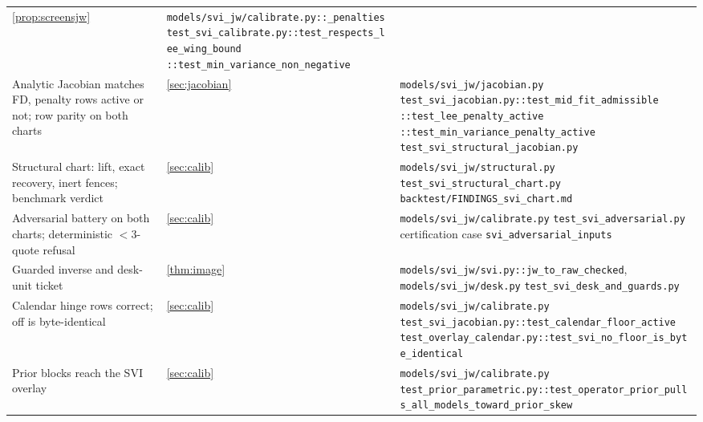 \documentclass[11pt]{article}
\begin{document}
\begin{longtable}{@{}p{}p{}p{}@{}}
\cref{prop:screensjw} &
\nolinkurl{models/svi_jw/calibrate.py::_penalties}\newline
\nolinkurl{test_svi_calibrate.py::test_respects_lee_wing_bound}\newline
\nolinkurl{::test_min_variance_non_negative}\\
\addlinespace
Analytic Jacobian matches FD, penalty rows active or not; row parity on
both charts &
\cref{sec:jacobian} &
\nolinkurl{models/svi_jw/jacobian.py}\newline
\nolinkurl{test_svi_jacobian.py::test_mid_fit_admissible}\newline
\nolinkurl{::test_lee_penalty_active}\newline
\nolinkurl{::test_min_variance_penalty_active}\newline
\nolinkurl{test_svi_structural_jacobian.py}\\
\addlinespace
Structural chart: lift, exact recovery, inert fences; benchmark verdict &
\cref{sec:calib} &
\nolinkurl{models/svi_jw/structural.py}\newline
\nolinkurl{test_svi_structural_chart.py}\newline
\nolinkurl{backtest/FINDINGS_svi_chart.md}\\
\addlinespace
Adversarial battery on both charts; deterministic $<3$-quote refusal &
\cref{sec:calib} &
\nolinkurl{models/svi_jw/calibrate.py}\newline
\nolinkurl{test_svi_adversarial.py}\newline
certification case \texttt{svi\_adversarial\_inputs}\\
\addlinespace
Guarded inverse and desk-unit ticket &
\cref{thm:image} &
\nolinkurl{models/svi_jw/svi.py::jw_to_raw_checked},
\nolinkurl{models/svi_jw/desk.py}\newline
\nolinkurl{test_svi_desk_and_guards.py}\\
\addlinespace
Calendar hinge rows correct; off is byte-identical &
\cref{sec:calib} &
\nolinkurl{models/svi_jw/calibrate.py}\newline
\nolinkurl{test_svi_jacobian.py::test_calendar_floor_active}\newline
\nolinkurl{test_overlay_calendar.py::test_svi_no_floor_is_byte_identical}\\
\addlinespace
Prior blocks reach the SVI overlay &
\cref{sec:calib} &
\nolinkurl{models/svi_jw/calibrate.py}\newline
\nolinkurl{test_prior_parametric.py::test_operator_prior_pulls_all_models_toward_prior_skew}\\
\bottomrule
\end{longtable}
\endgroup
\end{document}
